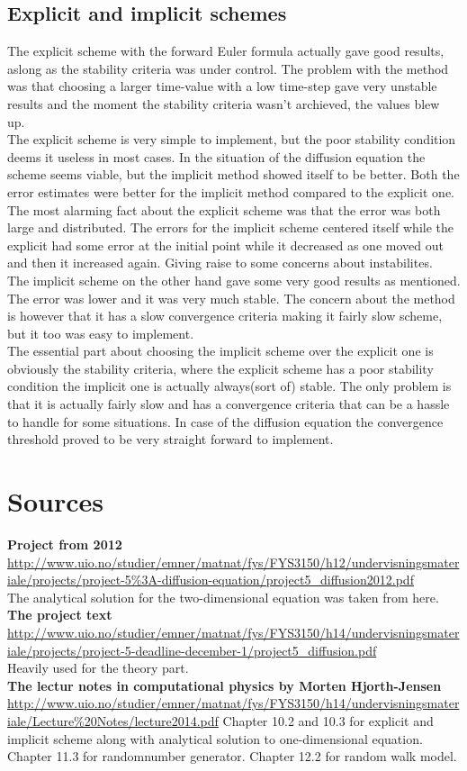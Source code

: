 \documentclass[a4paper,11pt]{article}
\newcommand{\vsp}{\vspace{0.2cm}} %
\newcommand{\secti}[1]{\centering \section{{#1}} \justifying} %
\begin{document}
\subsection{Explicit and implicit schemes}
    The explicit scheme with the forward Euler formula actually gave good results, aslong as the stability criteria was under control. The problem with the method was that choosing a larger time-value with a low time-step gave very unstable results and the moment the stability criteria wasn't archieved, the values blew up.\\
    The explicit scheme is very simple to implement, but the poor stability condition deems it useless in most cases. In the situation of the diffusion equation the scheme seems viable, but the implicit method showed itself to be better. Both the error estimates were better for the implicit method compared to the explicit one. The most alarming fact about the explicit scheme was that the error was both large and distributed. The errors for the implicit scheme centered itself while the explicit had some error at the initial point while it decreased as one moved out and then it increased again. Giving raise to some concerns about instabilites.\\
    The implicit scheme on the other hand gave some very good results as mentioned. The error was lower and it was very much stable. The concern about the method is however that it has a slow convergence criteria making it fairly slow scheme, but it too was easy to implement.\\ 
    The essential part about choosing the implicit scheme over the explicit one is obviously the stability criteria, where the explicit scheme has a poor stability condition the implicit one is actually always(sort of) stable. The only problem is that it is actually fairly slow and has a convergence criteria that can be a hassle to handle for some situations. In case of the diffusion equation the convergence threshold proved to be very straight forward to implement.

\newpage
\secti{Sources}
\textbf{Project from 2012}\\
\url{http://www.uio.no/studier/emner/matnat/fys/FYS3150/h12/undervisningsmateriale/projects/project-5\%3A-diffusion-equation/project5\_diffusion2012.pdf}\\
The analytical solution for the two-dimensional equation was taken from here.\vsp \\
\textbf{The project text}\\
\url{http://www.uio.no/studier/emner/matnat/fys/FYS3150/h14/undervisningsmateriale/projects/project-5-deadline-december-1/project5\_diffusion.pdf}\\
Heavily used for the theory part.\vsp \\
\textbf{The lectur notes in computational physics by Morten Hjorth-Jensen}\\
\url{http://www.uio.no/studier/emner/matnat/fys/FYS3150/h14/undervisningsmateriale/Lecture\%20Notes/lecture2014.pdf}
Chapter 10.2 and 10.3 for explicit and implicit scheme along with analytical solution to one-dimensional equation. Chapter 11.3 for randomnumber generator. Chapter 12.2 for random walk model.
\end{document}
